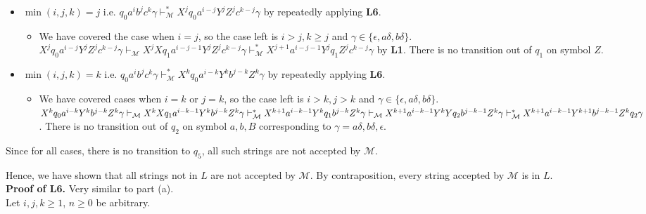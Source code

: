 \documentclass[12pt]{article}
\begin{document}
\begin{itemize}
\begin{itemize}
\begin{itemize}
      \(X^iq_0Y^iZ^i\gamma \vdash^*_\mathcal{M} X^iY^iZ^iq_4\gamma\) by \textbf{L4}. No transition out of \(q_4\) on symbol \(a\) or \(b\).
    \end{itemize}
    \item \(\min(i, j, k) = j\) i.e. \(q_0a^ib^jc^k\gamma \vdash^*_\mathcal{M} X^jq_0a^{i-j}Y^jZ^jc^{k-j}\gamma\) by repeatedly applying \textbf{L6}.
    \begin{itemize}
      \item We have covered the case when \(i =j\), so the case left is \(i > j, k \geq j\) and \(\gamma \in \{\epsilon, a\delta, b\delta\}\).\\ \(X^jq_0a^{i-j}Y^jZ^jc^{k-j}\gamma \vdash_\mathcal{M} X^jXq_1a^{i-j-1}Y^jZ^jc^{k-j}\gamma \vdash^*_\mathcal{M} X^{j+1}a^{i-j-1}Y^jq_1Z^jc^{k-j}\gamma\) by \textbf{L1}. There is no transition out of \(q_1\) on symbol \(Z\).
    \end{itemize}
    \item \(\min(i, j, k) = k\) i.e. \(q_0a^ib^jc^k\gamma \vdash^*_\mathcal{M} X^kq_0a^{i-k}Y^kb^{j-k}Z^k\gamma\) by repeatedly applying \textbf{L6}.
    \begin{itemize}
      \item We have covered cases when \(i = k\) or \(j = k\), so the case left is \(i > k, j > k\) and \(\gamma \in \{\epsilon, a\delta, b\delta\}\).\\
      \(X^kq_0a^{i-k}Y^kb^{j-k}Z^k\gamma \vdash_\mathcal{M} X^kXq_1a^{i-k-1}Y^kb^{j-k}Z^k\gamma \vdash^*_\mathcal{M} X^{k+1}a^{i-k-1}Y^kq_1b^{j-k}Z^k\gamma \\ \vdash_\mathcal{M} X^{k+1}a^{i-k-1}Y^kYq_2b^{j-k-1}Z^k\gamma \vdash^*_\mathcal{M} X^{k+1}a^{i-k-1}Y^{k+1}b^{j-k-1}Z^kq_2\gamma\). There is no transition out of \(q_2\) on symbol \(a, b, B\) corresponding to \(\gamma = a\delta, b\delta, \epsilon\).
    \end{itemize}
  \end{itemize}
  Since for all cases, there is no transition to \(q_5\), all such strings are not accepted by \(\mathcal{M}\).
\end{itemize}
Hence, we have shown that all strings not in \(L\) are not accepted by \(\mathcal{M}\). By contraposition, every string accepted by \(\mathcal{M}\) is in \(L\).\\
\noindent
\textbf{Proof of L6.} Very similar to part (a).\\
   Let \(i, j, k \geq 1\), \(n \geq 0\) be arbitrary.
\end{document}

